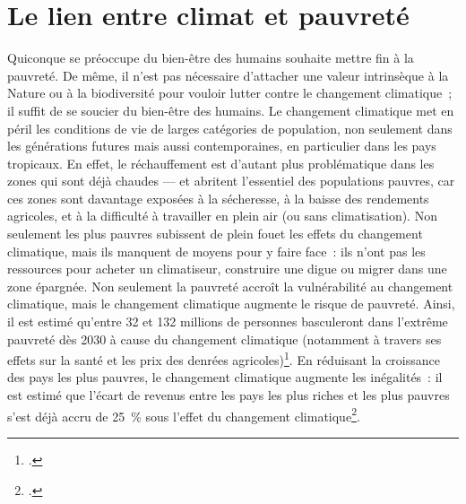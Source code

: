\documentclass[a5paper,french,openany]{memoir}
\begin{document}
\section{Le lien entre climat et pauvreté} 

Quiconque se préoccupe du bien-être des humains souhaite mettre fin à la pauvreté. 
De même, il n'est pas nécessaire d'attacher une valeur intrinsèque à la Nature ou à la biodiversité pour vouloir lutter contre le changement climatique~; il suffit de se soucier du bien-être des humains. Le changement climatique met en péril les conditions de vie de larges catégories de population, non seulement dans les générations futures mais aussi contemporaines, en particulier dans les pays tropicaux. En effet, le réchauffement est d'autant plus problématique dans les zones qui sont déjà chaudes --- et abritent l'essentiel des populations pauvres, car ces zones sont davantage exposées à la sécheresse, à la baisse des rendements agricoles, et à la difficulté à travailler en plein air (ou sans climatisation). Non seulement les plus pauvres subissent de plein fouet les effets du changement climatique, mais ils manquent de moyens pour y faire face~: %
ils n'ont pas les ressources pour acheter un climatiseur, construire une digue ou migrer dans une zone épargnée. Non seulement la pauvreté accroît la vulnérabilité au changement climatique, mais le changement climatique augmente le risque de pauvreté. Ainsi, il est estimé qu'entre 32 et 132 millions de personnes basculeront dans l'extrême pauvreté dès 2030 à cause du changement climatique (notamment à travers ses effets sur la santé et les prix des denrées agricoles)\footnote{\cite{jafino_revised_2020}.}. En réduisant la croissance des pays les plus pauvres, le changement climatique augmente les inégalités~: il est estimé que l'écart de revenus entre les pays les plus riches et les plus pauvres s'est déjà accru de 25~\% sous l'effet du changement climatique\footnote{\cite{diffenbaugh_global_2019}.}. %

\end{document}
